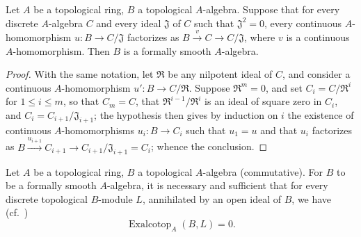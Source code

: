 \begin{proposition}[19.4.3]
\label{0.19.4.3}
Let $A$ be a topological ring, $B$ a topological $A$-algebra.
Suppose that for every discrete $A$-algebra $C$ and every ideal $\mathfrak{J}$ of $C$ such that $\mathfrak{J}^2=0$, every continuous $A$-homomorphism $u:B\to C/\mathfrak{J}$ factorizes as $B\xrightarrow{v}C\to C/\mathfrak{J}$, where $v$ is a continuous $A$-homomorphism.
Then $B$ is a formally smooth $A$-algebra.
\end{proposition}

\begin{proof}
With the same notation, let $\mathfrak{R}$ be any nilpotent ideal of $C$,
and consider a continuous $A$-homomorphism $u':B\to C/\mathfrak{R}$.
Suppose $\mathfrak{R}^m=0$, and set $C_i=C/\mathfrak{R}^i$ for $1\leq i\leq m$, so that $C_m=C$, that $\mathfrak{R}^{i-1}/\mathfrak{R}^i$ is an ideal of square zero in $C_i$, and $C_i=C_{i+1}/\mathfrak{J}_{i+1}$;
the hypothesis then gives by induction on $i$ the existence of continuous $A$-homomorphisms $u_i:B\to C_i$ such that $u_1=u$ and that $u_i$ factorizes as $B\xrightarrow{u_{i+1}}C_{i+1}\to C_{i+1}/\mathfrak{J}_{i+1}=C_i$;
whence the conclusion.
\end{proof}

\begin{proposition}[19.4.4]
\label{0.19.4.4}
Let $A$ be a topological ring, $B$ a topological $A$-algebra (commutative).
For $B$ to be a formally smooth $A$-algebra, it is necessary and sufficient that for
every discrete topological $B$-module $L$, annihilated by an open ideal of $B$, we have (cf.~)
\[
  \operatorname{Exalcotop}_A(B,L)=0.
\]
\end{proposition}

